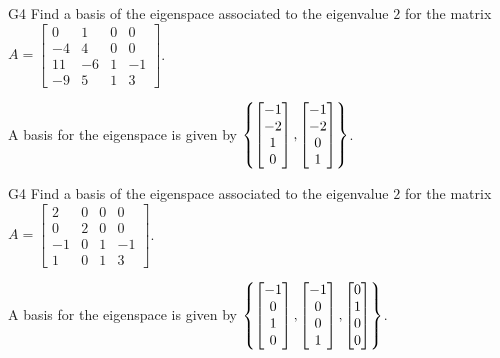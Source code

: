 \begin{problem}{G4}
Find a basis of the eigenspace associated to the eigenvalue \(2\) for the matrix 
\(A=\begin{bmatrix} 0 & 1 & 0 & 0 \\ -4 & 4 & 0 & 0 \\ 11 & -6 & 1 & -1 \\ -9 & 5 & 1 & 3 \end{bmatrix}\).
\end{problem}
\begin{solution}
A basis for the eigenspace is given by $\left\{\begin{bmatrix} -1 \\ -2 \\ 1 \\ 0 \end{bmatrix},\begin{bmatrix} -1 \\ -2 \\ 0 \\ 1 \end{bmatrix}\right\}$.
\end{solution}

\begin{problem}{G4}
Find a basis of the eigenspace associated to the eigenvalue $2$ for the matrix $A=\begin{bmatrix} 2 & 0 & 0 & 0 \\ 0 & 2 & 0 & 0 \\ -1 & 0 & 1 & -1 \\ 1 & 0 & 1 & 3 \end{bmatrix}$.
\end{problem}
\begin{solution}
A basis for the eigenspace is given by $\left\{\begin{bmatrix} -1 \\ 0 \\ 1 \\ 0 \end{bmatrix}, \begin{bmatrix} -1 \\ 0 \\ 0 \\ 1 \end{bmatrix},\begin{bmatrix} 0 \\ 1 \\ 0 \\ 0 \end{bmatrix}\right\}$.
\end{solution}

